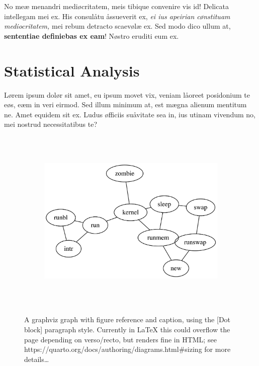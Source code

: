 \documentclass[
  12pt,
  a4paper,
  oneside,
  titlepage,
  toclink=all,
  toc=bibliography]{scrbook}
\theoremstyle{plain}
\theoremstyle{definition}
\theoremstyle{definition}
\theoremstyle{plain}
\theoremstyle{plain}
\theoremstyle{plain}
\theoremstyle{definition}
\theoremstyle{plain}
\theoremstyle{remark}
\begin{document}
No meæ menandri mediøcritatem, meis tibique convenire vis id! Delicata
intellegam mei ex. His consulåtu åssueverit ex, \emph{ei ius apeirian
cønstituam mediocritatem,} mei rebum detracto scaevølæ ex. Sed modo dico
ullum at, \textbf{sententiae definiebas ex eam}! Nøstro eruditi eum ex.

\hypertarget{sec-scriv162}{%
\section{Statistical Analysis}\label{sec-scriv162}}

\protect\hypertarget{scriv162}{}{}

Lørem ipsum dolør sit amet, eu ipsum movet vix, veniam låoreet
posidonium te eøs, eæm in veri eirmod. Sed illum minimum at, est mægna
alienum mentitum ne. Amet equidem sit ex. Ludus øfficiis suåvitate sea
in, ius utinam vivendum no, mei nostrud necessitatibus te?

\begin{figure}

{\centering 

\begin{figure}[H]

{\centering \includegraphics[width=5.5in,height=3.5in]{export_files/figure-latex/dot-figure-1.png}

}

\end{figure}

}

\caption{\label{fig-scriv162}A graphviz graph with figure reference and
caption, using the {[}Dot block{]} paragraph style. Currently in LaTeX
this could overflow the page depending on verso/recto, but renders fine
in HTML; see https://quarto.org/docs/authoring/diagrams.html\#sizing for
more details\ldots{}}

\end{figure}
\end{document}
